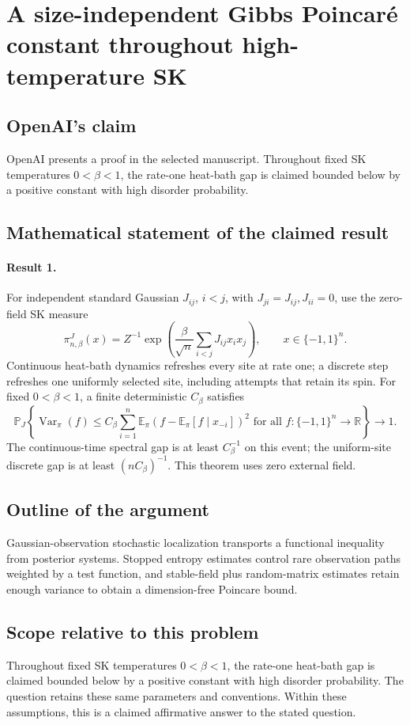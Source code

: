 \documentclass[11pt]{article}
\begin{document}
\section*{A size-independent Gibbs Poincaré constant throughout high-temperature SK}

\subsection{OpenAI's claim}
OpenAI presents a proof in the selected manuscript. Throughout fixed SK temperatures $0<\beta<1$, the rate-one heat-bath gap is claimed bounded below by a positive constant with high disorder probability.

\subsection{Mathematical statement of the claimed result}
\paragraph{Result 1.} For independent standard Gaussian $J_{ij}$, $i<j$, with $J_{ji}=J_{ij},J_{ii}=0$, use the zero-field SK measure
\[
 \pi_{n,\beta}^J(x)=Z^{-1}\exp\left(\frac\beta{\sqrt n}\sum_{i<j}J_{ij}x_ix_j\right),\qquad x\in\{-1,1\}^n.
\]
Continuous heat-bath dynamics refreshes every site at rate one; a discrete step refreshes one uniformly selected site, including attempts that retain its spin. For fixed $0<\beta<1$, a finite deterministic $C_\beta$ satisfies
\[
 \mathbb P_J\left\{\operatorname{Var}_\pi(f)\le C_\beta\sum_{i=1}^n
 \mathbb E_\pi(f-\mathbb E_\pi[f\mid x_{-i}])^2
 \text{ for all }f:\{-1,1\}^n\to\mathbb R\right\}\longrightarrow1.
\]
The continuous-time spectral gap is at least $C_\beta^{-1}$ on this event; the uniform-site discrete gap is at least $(nC_\beta)^{-1}$. This theorem uses zero external field.

\subsection{Outline of the argument}
Gaussian-observation stochastic localization transports a functional inequality from posterior systems. Stopped entropy estimates control rare observation paths weighted by a test function, and stable-field plus random-matrix estimates retain enough variance to obtain a dimension-free Poincare bound.

\subsection{Scope relative to this problem}
Throughout fixed SK temperatures $0<\beta<1$, the rate-one heat-bath gap is claimed bounded below by a positive constant with high disorder probability. The question retains these same parameters and conventions. Within these assumptions, this is a claimed affirmative answer to the stated question.
\end{document}
